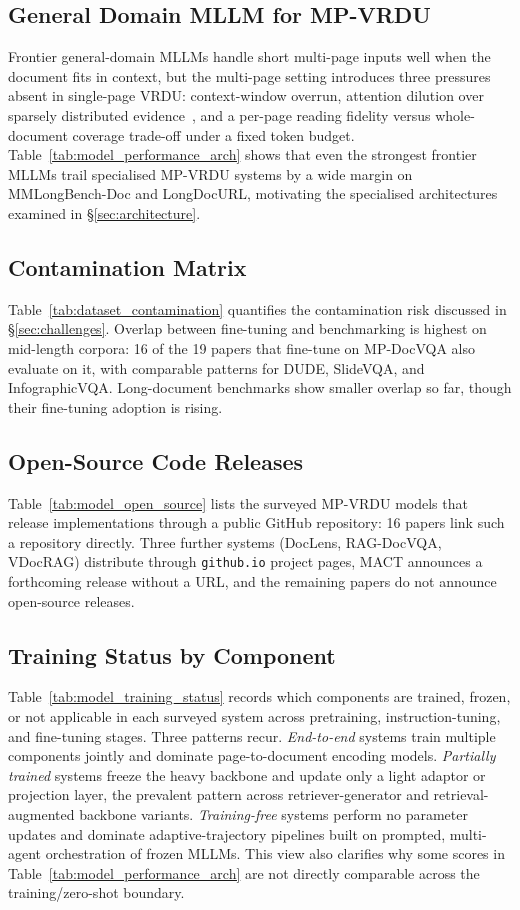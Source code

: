 \documentclass[11pt]{article}
\begin{document}
\subsection{General Domain MLLM for MP-VRDU}
\label{app:general-MLLM}
Frontier general-domain MLLMs handle short multi-page inputs well when the document fits in context, but the multi-page setting introduces three pressures absent in single-page VRDU: context-window overrun, attention dilution over sparsely distributed evidence~\cite{liu2024lost}, and a per-page reading fidelity versus whole-document coverage trade-off under a fixed token budget. Table~\ref{tab:model_performance_arch} shows that even the strongest frontier MLLMs trail specialised MP-VRDU systems by a wide margin on MMLongBench-Doc and LongDocURL, motivating the specialised architectures examined in \S\ref{sec:architecture}.


\subsection{Contamination Matrix}
\label{app:contamination}
Table~\ref{tab:dataset_contamination} quantifies the contamination risk discussed in \S\ref{sec:challenges}. Overlap between fine-tuning and benchmarking is highest on mid-length corpora: 16 of the 19 papers that fine-tune on MP-DocVQA also evaluate on it, with comparable patterns for DUDE, SlideVQA, and InfographicVQA. Long-document benchmarks show smaller overlap so far, though their fine-tuning adoption is rising.

\subsection{Open-Source Code Releases}
\label{app:open-source}
Table~\ref{tab:model_open_source} lists the surveyed MP-VRDU models that release implementations through a public GitHub repository: 16 papers link such a repository directly. Three further systems (DocLens, RAG-DocVQA, VDocRAG) distribute through \texttt{github.io} project pages, MACT announces a forthcoming release without a URL, and the remaining papers do not announce open-source releases.

\subsection{Training Status by Component}
\label{app:training-status}
Table~\ref{tab:model_training_status} records which components are trained, frozen, or not applicable in each surveyed system across pretraining, instruction-tuning, and fine-tuning stages. Three patterns recur. \emph{End-to-end} systems train multiple components jointly and dominate page-to-document encoding models. \emph{Partially trained} systems freeze the heavy backbone and update only a light adaptor or projection layer, the prevalent pattern across retriever-generator and retrieval-augmented backbone variants. \emph{Training-free} systems perform no parameter updates and dominate adaptive-trajectory pipelines built on prompted, multi-agent orchestration of frozen MLLMs. This view also clarifies why some scores in Table~\ref{tab:model_performance_arch} are not directly comparable across the training/zero-shot boundary.
\end{document}

